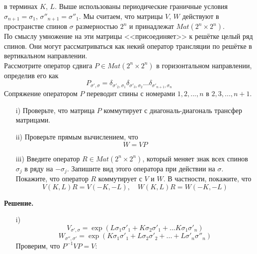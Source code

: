 \documentclass[12pt]{article}
\theoremstyle{definition}
\begin{document}
\begin{enumerate}
    в терминах $K$, $L$. Выше использованы периодические граничные условия $\sigma_{n+1}=\sigma_1$, $\sigma''_{n+1}=\sigma''_1$. Мы считаем, что матрицы $V$, $W$ действуют в пространстве спинов $\sigma$ размерностью $2^n$ и принадлежат $Mat(2^n\times2^n)$.\\
    По смыслу умножение на эти матрицы <<присоединяет>> к решётке целый ряд спинов. Они могут рассматриваться как некий оператор трансляции по решётке в вертикальном направлении.\\
    Рассмотрите оператор сдвига $P\in Mat(2^n\times2^n)$ в горизонтальном направлении, определив его как
    \begin{equation}
        P_{\sigma',\sigma}=\delta_{\sigma'_2,\sigma_1}\delta_{\sigma'_3,\sigma_2}...\delta_{\sigma'_{n+1},\sigma_n}
    \end{equation}
    Сопряжение оператором $P$ переводит спины с номерами $1,2,...,n$ в $2,3,...,n+1$.
    \begin{itemize}
        \item[i)] Проверьте, что матрица $P$ коммутирует с диагональ-диагональ трансфер матрицами.
        \item[ii)] Проверьте прямым вычислением, что
        \begin{equation}
            W=VP
        \end{equation}
        \item[iii)] Введите оператор $R\in Mat(2^n\times2^n)$, который меняет знак всех спинов $\sigma_j$ в ряду на $-\sigma_j$. Запишите вид этого оператора при действии на $\sigma$. Покажите, что оператор $R$ коммутирует с $V$ и $W$. В частности, покажите, что
        \begin{equation}
            V(K,L)R=V(-K,-L),\quad W(K,L)R=W(-K,-L)
        \end{equation}
    \end{itemize}
    \textbf{Решение.}
    \begin{itemize}
        \item[i)] 
        \begin{equation}
            V_{\sigma',\sigma}=\exp(L\sigma_1\sigma'_1+K\sigma_2\sigma'_1+...K\sigma_1\sigma'_n)
        \end{equation}
        \begin{equation}
            W_{\sigma'',\sigma'}=\exp(K\sigma_1\sigma'_1+L\sigma_2\sigma'_2+...+L\sigma'_n\sigma''_n)
        \end{equation}
        Проверим, что $P^{-1}VP=V$:
        \begin{multline}

\end{multline}
\end{itemize}
\end{enumerate}
\end{document}
